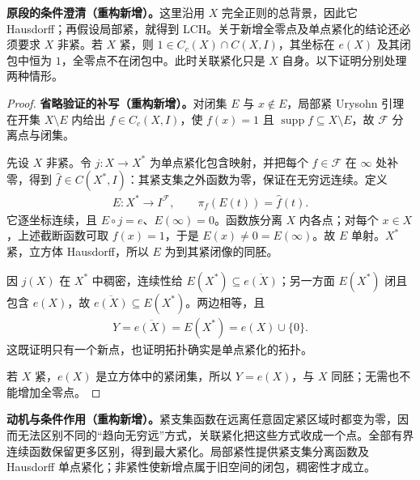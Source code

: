 \documentclass[../../main.tex]{subfiles}
\begin{document}
\begin{remark}
\textbf{原段的条件澄清（重构新增）。}这里沿用 $X$ 完全正则的总背景，因此它 Hausdorff；再假设局部紧，就得到 LCH。关于新增全零点及单点紧化的结论还必须要求 $X$ 非紧。若 $X$ 紧，则 $1\in C_c(X)\cap C(X,I)$，其坐标在 $e(X)$ 及其闭包中恒为 $1$，全零点不在闭包中。此时关联紧化只是 $X$ 自身。以下证明分别处理两种情形。
\end{remark}
\begin{proof}
\textbf{省略验证的补写（重构新增）。}对闭集 $E$ 与 $x\notin E$，局部紧 Urysohn 引理在开集 $X\setminus E$ 内给出 $f\in C_c(X,I)$，使 $f(x)=1$ 且 $\operatorname{supp}f\subseteq X\setminus E$，故 $\mathcal F$ 分离点与闭集。

先设 $X$ 非紧。令 $j:X\to X^*$ 为单点紧化包含映射，并把每个 $f\in\mathcal F$ 在 $\infty$ 处补零，得到 $\widehat f\in C(X^*,I)$：其紧支集之外函数为零，保证在无穷远连续。定义
\begin{align*}
E:X^*\longrightarrow I^{\mathcal F},\qquad
\pi_f(E(t))=\widehat f(t).
\end{align*}
它逐坐标连续，且 $E\circ j=e$、$E(\infty)=0$。函数族分离 $X$ 内各点；对每个 $x\in X$，上述截断函数可取 $f(x)=1$，于是 $E(x)\ne0=E(\infty)$。故 $E$ 单射。$X^*$ 紧，立方体 Hausdorff，所以 $E$ 为到其紧闭像的同胚。

因 $j(X)$ 在 $X^*$ 中稠密，连续性给 $E(X^*)\subseteq\overline{e(X)}$；另一方面 $E(X^*)$ 闭且包含 $e(X)$，故 $\overline{e(X)}\subseteq E(X^*)$。两边相等，且
\begin{align*}
Y=\overline{e(X)}=E(X^*)=e(X)\cup\{0\}.
\end{align*}
这既证明只有一个新点，也证明拓扑确实是单点紧化的拓扑。

若 $X$ 紧，$e(X)$ 是立方体中的紧闭集，所以 $Y=e(X)$，与 $X$ 同胚；无需也不能增加全零点。
\end{proof}
\begin{remark}
\textbf{动机与条件作用（重构新增）。}紧支集函数在远离任意固定紧区域时都变为零，因而无法区别不同的“趋向无穷远”方式，关联紧化把这些方式收成一个点。全部有界连续函数保留更多区别，得到最大紧化。局部紧性提供紧支集分离函数及 Hausdorff 单点紧化；非紧性使新增点属于旧空间的闭包，稠密性才成立。
\end{remark}
\end{document}
